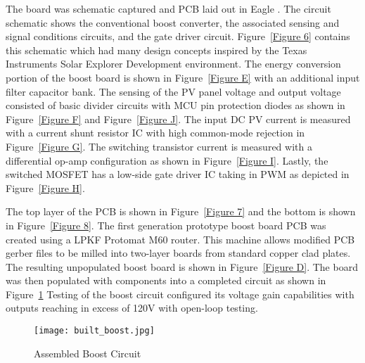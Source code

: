 The board was schematic captured and PCB laid out in Eagle . The circuit schematic shows the conventional boost converter, the associated sensing and signal conditions circuits, and the gate driver circuit. Figure~\ref{Figure 6}  contains this schematic which had many design concepts inspired by the Texas Instruments Solar Explorer Development environment.\cite{tiAppReportControl} The energy conversion portion of the boost board is shown in Figure~\ref{Figure E}  with an additional input filter capacitor bank. The sensing of the PV panel voltage and output voltage consisted of basic divider circuits with MCU pin protection diodes as shown in Figure~\ref{Figure F} and Figure~\ref{Figure J}. The input DC PV current is measured with a current shunt resistor IC with high common-mode rejection in Figure~\ref{Figure G}. The switching transistor current is measured with a differential op-amp configuration as shown in Figure~\ref{Figure I}. Lastly, the switched MOSFET has a low-side gate driver IC taking in PWM as depicted in Figure~\ref{Figure H}. 

The top layer of the PCB is shown in Figure~\ref{Figure 7}  and the bottom is shown in Figure~\ref{Figure 8}. The first generation prototype boost board PCB was created using a LPKF Protomat M60 router. This machine allows modified PCB gerber files to be milled into two-layer boards from standard copper clad plates. The resulting unpopulated boost board is shown in Figure~\ref{Figure D}. The board was then populated with components into a completed circuit as shown in Figure~\ref{Built Boost} Testing of the boost circuit configured its voltage gain capabilities with outputs reaching in excess of 120V with open-loop testing.

\begin{figure}
\centering
\texttt{[image: built\_boost.jpg]}
\caption{Assembled Boost Circuit}
\label{Built Boost}
\end{figure}

